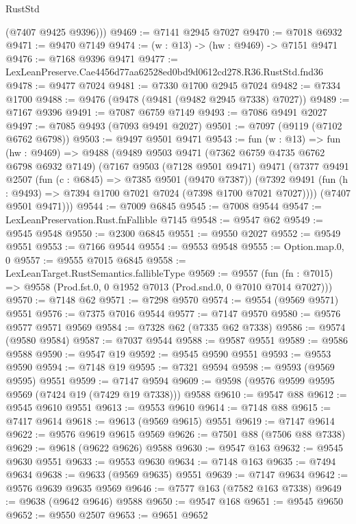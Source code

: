 \begin{lexlean}{RustStd}
\begin{coremodule}
        (@7407 @9425 @9396)))
@9469 := @7141 @2945 @7027
@9470 := @7018 @6932
@9471 := @9470 @7149
@9474 := (w : @13) -> (hw : @9469) -> @7151 @9471
@9476 := @7168 @9396 @9471
@9477 := LexLeanPreserve.Cae4456d77aa62528ed0bd9d0612cd278.R36.RustStd.fnd36
@9478 := @9477 @7024
@9481 := @7330 @1700 @2945 @7024
@9482 := @7334 @1700
@9488 := @9476 (@9478 (@9481 (@9482 @2945 @7338) @7027))
@9489 := @7167 @9396
@9491 := @7087 @6759 @7149
@9493 := @7086 @9491 @2027
@9497 := @7085 @9493 (@7093 @9491 @2027)
@9501 := @7097 (@9119 (@7102 @6762 @6798))
@9503 := @9497 @9501 @9471
@9543 := fun (w : @13) =>
  fun (hw : @9469) =>
  @9488
    (@9489
      @9503
      @9471
      (@7362 @6759 @4735 @6762 @6798 @6932 @7149)
      (@7167
        @9503
        (@7128 @9501 @9471)
        @9471
        (@7377
          @9491
          @2507
          (fun (c : @6845) => @7385 @9501 (@9470 @7387))
          (@7392 @9491 (fun (h : @9493) => @7394 @1700 @7021 @7024 (@7398 @1700 @7021 @7027))))
        (@7407 @9501 @9471)))
@9544 := @7009 @6845
@9545 := @7008 @9544
@9547 := LexLeanPreservation.Rust.fnFallible @7145
@9548 := @9547 @62
@9549 := @9545 @9548
@9550 := @2300 @6845
@9551 := @9550 @2027
@9552 := @9549 @9551
@9553 := @7166 @9544
@9554 := @9553 @9548
@9555 := Option.map.{0, 0}
@9557 := @9555 @7015 @6845
@9558 := LexLeanTarget.RustSemantics.fallibleType
@9569 := @9557
    (fun (fn : @7015) => @9558 (Prod.fst.{0, 0} @1952 @7013 (Prod.snd.{0, 0} @7010 @7014 @7027)))
@9570 := @7148 @62
@9571 := @7298 @9570
@9574 := @9554 (@9569 @9571) @9551
@9576 := @7375 @7016 @9544
@9577 := @7147 @9570
@9580 := @9576 @9577 @9571 @9569
@9584 := @7328 @62 (@7335 @62 @7338)
@9586 := @9574 (@9580 @9584)
@9587 := @7037 @9544
@9588 := @9587 @9551
@9589 := @9586 @9588
@9590 := @9547 @19
@9592 := @9545 @9590 @9551
@9593 := @9553 @9590
@9594 := @7148 @19
@9595 := @7321 @9594
@9598 := @9593 (@9569 @9595) @9551
@9599 := @7147 @9594
@9609 := @9598 (@9576 @9599 @9595 @9569 (@7424 @19 (@7429 @19 @7338))) @9588
@9610 := @9547 @88
@9612 := @9545 @9610 @9551
@9613 := @9553 @9610
@9614 := @7148 @88
@9615 := @7417 @9614
@9618 := @9613 (@9569 @9615) @9551
@9619 := @7147 @9614
@9622 := @9576 @9619 @9615 @9569
@9626 := @7501 @88 (@7506 @88 @7338)
@9629 := @9618 (@9622 @9626) @9588
@9630 := @9547 @163
@9632 := @9545 @9630 @9551
@9633 := @9553 @9630
@9634 := @7148 @163
@9635 := @7494 @9634
@9638 := @9633 (@9569 @9635) @9551
@9639 := @7147 @9634
@9642 := @9576 @9639 @9635 @9569
@9646 := @7577 @163 (@7582 @163 @7338)
@9649 := @9638 (@9642 @9646) @9588
@9650 := @9547 @168
@9651 := @9545 @9650
@9652 := @9550 @2507
@9653 := @9651 @9652

\end{coremodule}
\end{lexlean}
